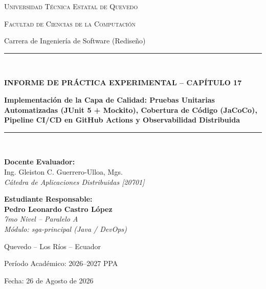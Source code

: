 \documentclass[11pt,a4paper]{article}
\begin{document}
\begin{titlepage}
    \centering
    {\scshape\LARGE Universidad Técnica Estatal de Quevedo \par}
    \vspace{0.3cm}
    {\scshape\Large Facultad de Ciencias de la Computación \par}
    \vspace{0.2cm}
    {\large Carrera de Ingeniería de Software (Rediseño) \par}
    \vspace{1.5cm}

    \rule{\linewidth}{0.5mm} \\[0.4cm]
    {\huge\bfseries INFORME DE PRÁCTICA EXPERIMENTAL -- CAPÍTULO 17\par}
    \vspace{0.2cm}
    {\Large\bfseries Implementación de la Capa de Calidad: Pruebas Unitarias Automatizadas (JUnit 5 + Mockito), Cobertura de Código (JaCoCo), Pipeline CI/CD en GitHub Actions y Observabilidad Distribuida\par}
    \rule{\linewidth}{0.5mm} \\[1.5cm]

    \begin{minipage}{0.48\textwidth}
        \textbf{Docente Evaluador:}\\
        Ing. Gleiston C. Guerrero-Ulloa, Mgs.\\
        \textit{Cátedra de Aplicaciones Distribuidas [20701]}
    \end{minipage}
    \hfill
    \begin{minipage}{0.48\textwidth}
        \begin{flushright}
            \textbf{Estudiante Responsable:}\\
            \textbf{Pedro Leonardo Castro López}\\
            \textit{7mo Nivel -- Paralelo A}\\
            \textit{Módulo: sga-principal (Java / DevOps)}
        \end{flushright}
    \end{minipage}

    \vfill
    {\large Quevedo -- Los Ríos -- Ecuador \par}
    {\large Período Académico: 2026--2027 PPA\par}
    {\large Fecha: 26 de Agosto de 2026\par}
\end{titlepage}
\end{document}
